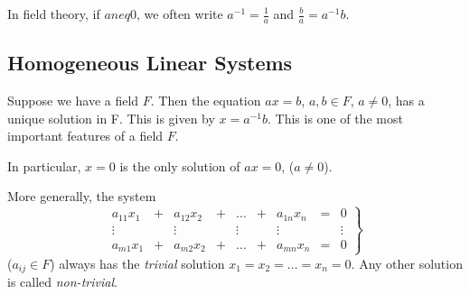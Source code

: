 \begin{notation}
	In field theory, if $a neq 0$, we often write $a^{-1} = \frac{1}{a}$ and $\frac{b}{a} = a^{-1}b$.
\end{notation}

\subsection{Homogeneous Linear Systems}
Suppose we have a field $F$. Then the equation $ax = b$, $a, b \in F$, $a \neq 0$, has a unique solution in F. This is given by $x = a^{-1}b$. This is one of the most important features of a field $F$.

In particular, $x = 0$ is the only solution of $ax = 0$, ($a \neq 0$).

More generally, the system
\begin{equation} \label{eq:hom-system}
	\left.
	\begin{matrix}
		a_{11} x_1 &+& a_{12} x_2 &+& \ldots &+& a_{1n} x_n &=& 0 \\
		\vdots	   & & \vdots	  & & \vdots & & \vdots		& & \vdots \\
		a_{m1} x_1 &+& a_{m2} x_2 &+& \ldots &+& a_{mn} x_n &=& 0
	\end{matrix}
	\right\}
\end{equation}
($a_{ij} \in F$) always has the \emph{trivial} solution $x_1 = x_2 = \ldots = x_n = 0$. Any other solution is called \emph{non-trivial}.


